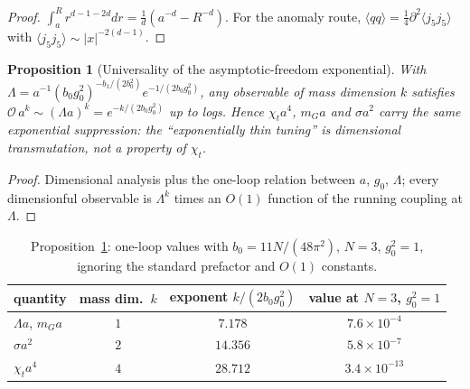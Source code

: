 \documentclass[11pt,a4paper]{article}
\theoremstyle{plain}
\newtheorem{proposition}[theorem]{Proposition}
\theoremstyle{definition}
\theoremstyle{remark}
\newcommand{\Chit}{\chi_t}
\renewcommand{\_}{\oldunderscore\allowbreak}
\begin{document}
\begin{proof}
$\int_a^Rr^{d-1-2d}dr=\frac1d(a^{-d}-R^{-d})$. For the anomaly route,
$\langle qq\rangle=\tfrac14\partial^2\langle j_5j_5\rangle$ with
$\langle j_5j_5\rangle\sim|x|^{-2(d-1)}$.
\end{proof}
\begin{proposition}[Universality of the asymptotic-freedom exponential]\label{prop:afexp}
With $\Lambda=a^{-1}(b_0g_0^2)^{-b_1/(2b_0^2)}\allowbreak e^{-1/(2b_0g_0^2)}$, any observable of mass
dimension $k$ satisfies $\mathcal{O}\,a^k\sim(\Lambda a)^k=e^{-k/(2b_0g_0^2)}$ up to logs. Hence
$\Chit a^4$, $m_Ga$ and $\sigma a^2$ carry the \emph{same} exponential suppression: the
``exponentially thin tuning'' is dimensional transmutation, not a property of $\Chit$.
\end{proposition}
\begin{proof}
Dimensional analysis plus the one-loop relation between $a$, $g_0$, $\Lambda$; every
dimensionful observable is $\Lambda^k$ times an $O(1)$ function of the running coupling at
$\Lambda$.
\end{proof}
\begin{table}[htbp]\centering\small
\renewcommand{\arraystretch}{1.2}
\begin{tabular}{lccc}
\toprule
quantity & mass dim.\ $k$ & exponent $k/(2b_0g_0^2)$ & value at $N=3$, $g_0^2=1$\\
\midrule
$\Lambda a$, $m_Ga$ & $1$ & $7.178$ & $7.6\times10^{-4}$\\
$\sigma a^2$ & $2$ & $14.356$ & $5.8\times10^{-7}$\\
$\Chit a^4$ & $4$ & $28.712$ & $3.4\times10^{-13}$\\
\bottomrule
\end{tabular}
\caption{Proposition~\ref{prop:afexp}: one-loop values with $b_0=11N/(48\pi^2)$, $N=3$,
$g_0^2=1$, ignoring the standard prefactor and $O(1)$ constants.}
\label{tab:afexp}
\end{table}
\end{document}
